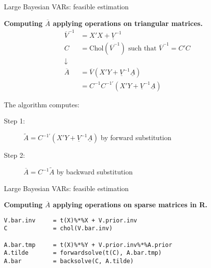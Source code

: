 \documentclass[notes,blackandwhite,mathsans,usenames,dvipsnames]{beamer}
\begin{document}
\begin{frame}{Large Bayesian VARs: feasible estimation}

\bigskip\textbf{Computing $\overline{A}$ applying operations on triangular matrices.}
\begin{align*} 
\overline{V}^{-1}&=  X'X + \underline{V}^{-1} \\
C &= \text{Chol}\left(\overline{V}^{-1}\right)\text{ such that } \overline{V}^{-1}=C'C\\
\downarrow&\\
\overline{A}&= \overline{V}\left( X'Y + \underline{V}^{-1}\underline{A} \right)\\
&= C^{-1}C^{-1\prime}\left( X'Y + \underline{V}^{-1}\underline{A} \right)
\end{align*} 

The algorithm computes:
\begin{description}
\item[Step 1:] $\tilde{A}=C^{-1\prime}\left( X'Y + \underline{V}^{-1}\underline{A} \right)$ by forward substitution
\item[Step 2:] $\overline{A}=C^{-1}\tilde{A}$ by backward substitution
\end{description}
\end{frame}

\begin{frame}[fragile]{Large Bayesian VARs: feasible estimation}

\bigskip\textbf{Computing $\overline{A}$ applying operations on sparse matrices in R.}\small

\begin{verbatim}
V.bar.inv     = t(X)%*%X + V.prior.inv
C             = chol(V.bar.inv)

A.bar.tmp     = t(X)%*%Y + V.prior.inv%*%A.prior
A.tilde       = forwardsolve(t(C), A.bar.tmp)
A.bar         = backsolve(C, A.tilde)
\end{verbatim}

\end{frame}
\end{document}
